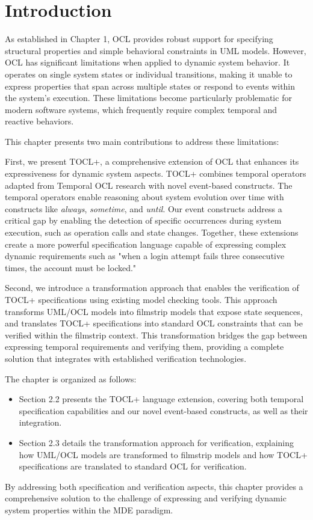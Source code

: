 \section{Introduction}

\hspace{1cm} As established in Chapter 1, OCL provides robust support for specifying structural properties 
and simple behavioral constraints in UML models. However, OCL has significant limitations 
when applied to dynamic system behavior. It operates on single system states or individual 
transitions, making it unable to express properties that span across multiple states or 
respond to events within the system's execution. These limitations become particularly 
problematic for modern software systems, which frequently require complex temporal and 
reactive behaviors.

This chapter presents two main contributions to address these limitations:

First, we present TOCL+, a comprehensive extension of OCL that enhances its expressiveness 
for dynamic system aspects. TOCL+ combines temporal operators adapted from Temporal OCL 
research with novel event-based constructs. The temporal operators enable reasoning about 
system evolution over time with constructs like \textit{always}, \textit{sometime}, and 
\textit{until}. Our event constructs address a critical gap by enabling the detection of 
specific occurrences during system execution, such as operation calls and state changes. 
Together, these extensions create a more powerful specification language capable of expressing 
complex dynamic requirements such as "when a login attempt fails three consecutive times, 
the account must be locked."

Second, we introduce a transformation approach that enables the verification of TOCL+ 
specifications using existing model checking tools. This approach transforms UML/OCL models 
into filmstrip models that expose state sequences, and translates TOCL+ specifications into 
standard OCL constraints that can be verified within the filmstrip context. This transformation 
bridges the gap between expressing temporal requirements and verifying them, providing a 
complete solution that integrates with established verification technologies.

The chapter is organized as follows:
\begin{itemize}
    \item Section 2.2 presents the TOCL+ language extension, covering both temporal 
    specification capabilities and our novel event-based constructs, as well as their 
    integration.
    
    \item Section 2.3 details the transformation approach for verification, explaining 
    how UML/OCL models are transformed to filmstrip models and how TOCL+ specifications 
    are translated to standard OCL for verification.
\end{itemize}

By addressing both specification and verification aspects, this chapter provides a 
comprehensive solution to the challenge of expressing and verifying dynamic system properties 
within the MDE paradigm.